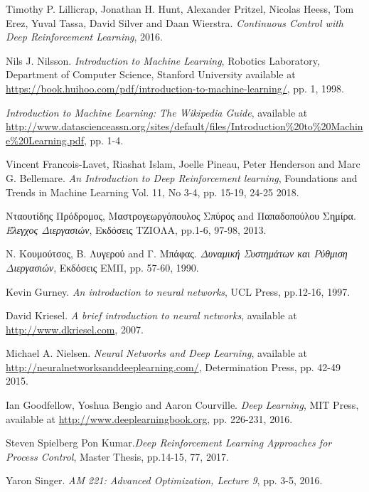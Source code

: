 \documentclass[11pt]{article} %
\numberwithin{equation}{subsection}
\begin{document}
\begin{thebibliography}{9}

Timothy P. Lillicrap, Jonathan H. Hunt, Alexander Pritzel, Nicolas Heess, Tom Erez, Yuval Tassa, David Silver and Daan Wierstra. \textit{Continuous Control with Deep Reinforcement Learning}, 2016.

Nils J. Nilsson. \textit{Introduction to Machine Learning}, Robotics Laboratory, Department of Computer Science, Stanford University available at \url{https://book.huihoo.com/pdf/introduction-to-machine-learning/}, pp. 1, 1998.

\textit{Introduction to Machine Learning: The Wikipedia Guide}, available at \url{http://www.datascienceassn.org/sites/default/files/Introduction%20to%20Machine%20Learning.pdf}, pp. 1-4.

Vincent Francois-Lavet, Riashat Islam, Joelle Pineau, Peter Henderson and Marc G. Bellemare. \textit{An Introduction to Deep Reinforcement learning}, Foundations and Trends in Machine Learning Vol. 11, No 3-4, pp. 15-19, 24-25 2018.

Νταουτίδης Πρόδρομος, Μαστρογεωργόπουλος Σπύρος and Παπαδοπούλου Σημίρα. \textit{Έλεγχος Διεργασιών}, Εκδόσεις ΤΖΙΟΛΑ, pp.1-6, 97-98, 2013.

N. Κουμούτσος, Β. Λυγερού and Γ. Μπάφας. \textit{Δυναμική Συστημάτων και Ρύθμιση Διεργασιών}, Εκδόσεις ΕΜΠ, pp. 57-60, 1990.

Kevin Gurney. \textit{An introduction to neural networks}, UCL Press, pp.12-16, 1997.

David Kriesel. \textit{A brief introduction to neural networks}, available at \url{http://www.dkriesel.com}, 2007.

Michael A. Nielsen. \textit{Neural Networks and Deep Learning}, available at \url{http://neuralnetworksanddeeplearning.com/}, Determination Press, pp. 42-49 2015.

Ian Goodfellow, Yoshua Bengio and Aaron Courville. \textit{Deep Learning}, MIT Press, available at \url{http://www.deeplearningbook.org}, pp. 226-231, 2016.

Steven Spielberg Pon Kumar.\textit{Deep Reinforcement Learning Approaches for Process Control}, Master Thesis, pp.14-15, 77, 2017.

Yaron Singer. \textit{AM 221: Advanced Optimization, Lecture 9}, pp. 3-5, 2016.


\end{thebibliography}
\end{document}
